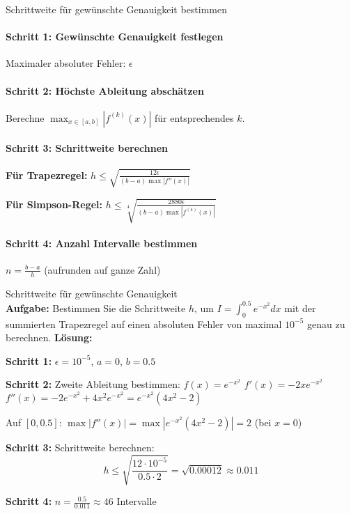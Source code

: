 \begin{KR}{Schrittweite für gewünschte Genauigkeit bestimmen}\\
\paragraph{Schritt 1: Gewünschte Genauigkeit festlegen}
Maximaler absoluter Fehler: $\epsilon$

\paragraph{Schritt 2: Höchste Ableitung abschätzen}
Berechne $\max_{x \in [a,b]} |f^{(k)}(x)|$ für entsprechendes $k$.

\paragraph{Schritt 3: Schrittweite berechnen}
\textbf{Für Trapezregel:} $h \leq \sqrt{\frac{12\epsilon}{(b-a) \max |f''(x)|}}$

\textbf{Für Simpson-Regel:} $h \leq \sqrt[4]{\frac{2880\epsilon}{(b-a) \max |f^{(4)}(x)|}}$

\paragraph{Schritt 4: Anzahl Intervalle bestimmen}
$n = \frac{b-a}{h}$ (aufrunden auf ganze Zahl)
\end{KR}

\begin{example2}{Schrittweite für gewünschte Genauigkeit}\\
\textbf{Aufgabe:} Bestimmen Sie die Schrittweite $h$, um $I = \int_0^{0.5} e^{-x^2} dx$ mit der summierten Trapezregel auf einen absoluten Fehler von maximal $10^{-5}$ genau zu berechnen.
\tcblower
\textbf{Lösung:}

\textbf{Schritt 1:} $\epsilon = 10^{-5}$, $a = 0$, $b = 0.5$

\textbf{Schritt 2:} Zweite Ableitung bestimmen:
$f(x) = e^{-x^2}$
$f'(x) = -2xe^{-x^2}$
$f''(x) = -2e^{-x^2} + 4x^2e^{-x^2} = e^{-x^2}(4x^2 - 2)$

Auf $[0, 0.5]$: $\max |f''(x)| = \max |e^{-x^2}(4x^2 - 2)| = 2$ (bei $x = 0$)

\textbf{Schritt 3:} Schrittweite berechnen:
$$h \leq \sqrt{\frac{12 \cdot 10^{-5}}{0.5 \cdot 2}} = \sqrt{0.00012} \approx 0.011$$

\textbf{Schritt 4:} $n = \frac{0.5}{0.011} \approx 46$ Intervalle
\end{example2}

